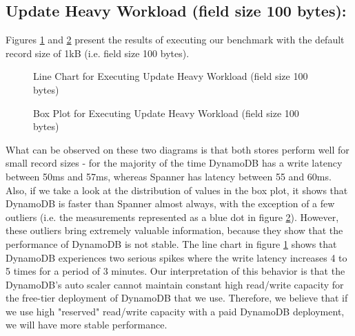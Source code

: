 \documentclass[letterpaper, 10 pt, conference]{ieeeconf}  %
\begin{document}
\subsection{Update Heavy Workload (field size 100 bytes):}
Figures \ref{fig:workloadA_size100} and \ref{fig:boxplot_size100} present the results of executing our benchmark with the default record size of 1kB (i.e. field size 100 bytes).
\begin{figure}[h]
\centering
{}
\caption{Line Chart for Executing Update Heavy Workload (field size 100 bytes)}
\label{fig:workloadA_size100}
\end{figure}  
 
\begin{figure}[h]
\centering
{}
\caption{Box Plot for Executing Update Heavy Workload (field size 100 bytes)}
\label{fig:boxplot_size100}
\end{figure} 
What can be observed on these two diagrams is that both stores perform well for small record sizes - for the majority of the time DynamoDB has a write latency between 50ms and 57ms, whereas Spanner has latency between 55 and 60ms. Also, if we take a look at the distribution of values in the box plot, it shows that DynamoDB is faster than Spanner almost always, with the exception of a few outliers (i.e. the measurements represented as a blue dot in figure \ref{fig:boxplot_size100}). However, these outliers bring extremely valuable information, because they show that the performance of DynamoDB is not stable. The line chart in figure \ref{fig:workloadA_size100} shows that DynamoDB experiences two serious spikes where the write latency increases 4 to 5 times for a period of 3 minutes. Our interpretation of this behavior is that the DynamoDB's auto scaler cannot maintain constant high read/write capacity for the free-tier deployment of DynamoDB that we use. Therefore, we believe that if we use high "reserved" read/write capacity with a paid DynamoDB deployment, we will have more stable performance.
\end{document}
